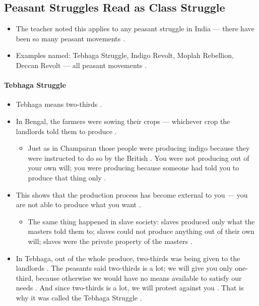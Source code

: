 \subsection{Peasant Struggles Read as Class Struggle}
\begin{itemize}
    \item The teacher noted this applies to any peasant struggle in India --- there have been so many peasant movements .
    \item Examples named: Tebhaga Struggle, Indigo Revolt, Moplah Rebellion, Deccan Revolt --- all peasant movements .
\end{itemize}

\paragraph{Tebhaga Struggle}
\begin{itemize}
    \item Tebhaga means two-thirds .
    \item In Bengal, the farmers were sowing their crops --- whichever crop the landlords told them to produce .
    \begin{itemize}
        \item Just as in Champaran those people were producing indigo because they were instructed to do so by the British . You were not producing out of your own will; you were producing because someone had told you to produce that thing only .
    \end{itemize}
    \item This shows that the production process has become external to you --- you are not able to produce what you want .
    \begin{itemize}
        \item The same thing happened in slave society: slaves produced only what the masters told them to; slaves could not produce anything out of their own will; slaves were the private property of the masters .
    \end{itemize}
    \item In Tebhaga, out of the whole produce, two-thirds was being given to the landlords . The peasants said two-thirds is a lot; we will give you only one-third, because otherwise we would have no means available to satisfy our needs . And since two-thirds is a lot, we will protest against you . That is why it was called the Tebhaga Struggle .
\end{itemize}

